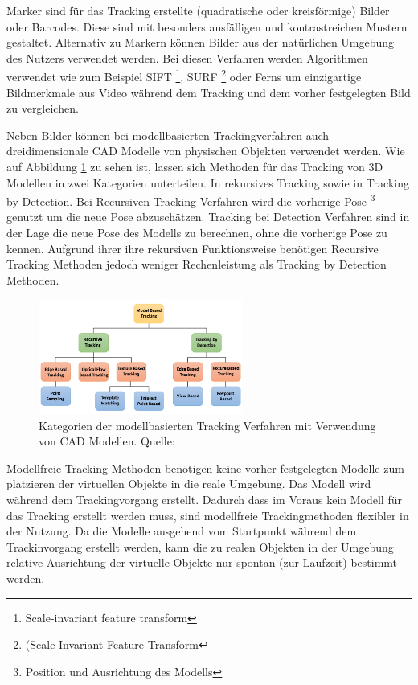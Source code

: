 Marker sind für das Tracking erstellte (quadratische oder kreisförmige) Bilder oder Barcodes. Diese sind mit besonders ausfälligen und kontrastreichen Mustern gestaltet. Alternativ zu Markern können Bilder aus der natürlichen Umgebung des Nutzers verwendet werden.\cite{Cukovic2015} Bei diesen Verfahren werden Algorithmen verwendet wie zum Beispiel SIFT \footnote{Scale-invariant feature transform}, SURF \footnote{(Scale Invariant Feature Transform} oder Ferns um einzigartige Bildmerkmale aus Video während dem Tracking und dem vorher festgelegten Bild zu vergleichen.

Neben Bilder können bei modellbasierten Trackingverfahren auch dreidimensionale CAD Modelle von physischen Objekten verwendet werden. \cite{Lowney2016} Wie auf Abbildung \ref{img:modellbased_categories} zu sehen ist, lassen sich Methoden für das Tracking von 3D Modellen in zwei Kategorien unterteilen. In rekursives Tracking sowie in Tracking by Detection. Bei Recursiven Tracking Verfahren wird die vorherige Pose \footnote{Position und Ausrichtung des Modells} genutzt um die neue Pose abzuschätzen. Tracking bei Detection Verfahren sind in der Lage die neue Pose des Modells zu berechnen, ohne die vorherige Pose zu kennen. Aufgrund ihrer ihre rekursiven 
Funktionsweise benötigen Recursive Tracking Methoden jedoch weniger Rechenleistung als Tracking by Detection Methoden. 

\begin{figure}[H]
	\centering
	\includegraphics[width=0.6\textwidth]{resources/fundamentals/model_based_tracking_taxonomies.png}
	\caption{Kategorien der modellbasierten Tracking Verfahren mit Verwendung von CAD Modellen. Quelle: \cite[S.~86]{Lowney2016}}
	\label{img:modellbased_categories}
\end{figure} 

Modellfreie Tracking Methoden benötigen keine vorher festgelegten Modelle zum platzieren der virtuellen Objekte in die reale Umgebung. \cite[S.~106]{DieterSchmalstieg2016} Das Modell wird während dem Trackingvorgang 
erstellt. Dadurch dass im Voraus kein Modell für das Tracking erstellt werden muss, sind modellfreie Trackingmethoden flexibler in der Nutzung. Da die Modelle ausgehend vom Startpunkt während dem Trackinvorgang 
erstellt werden, kann die zu realen Objekten in der Umgebung relative Ausrichtung der virtuelle Objekte nur spontan (zur Laufzeit) bestimmt werden. 

